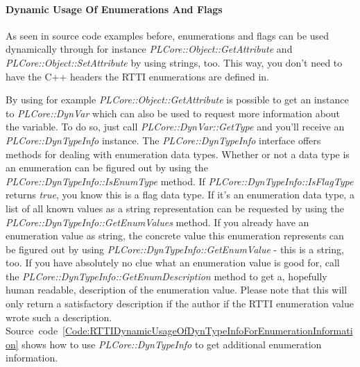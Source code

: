 \paragraph{Dynamic Usage Of Enumerations And Flags}
As seen in source code examples before, enumerations and flags can be used dynamically through for instance \emph{PLCore::Object::GetAttribute} and \emph{PLCore::Object::SetAttribute} by using strings, too. This way, you don't need to have the C++ headers the RTTI enumerations are defined in.

By using for example \emph{PLCore::Object::GetAttribute} is possible to get an instance to \emph{PLCore::DynVar} which can also be used to request more information about the variable. To do so, just call \emph{PLCore::DynVar::GetType} and you'll receive an \emph{PLCore::DynTypeInfo} instance. The \emph{PLCore::DynTypeInfo} interface offers methods for dealing with enumeration data types. Whether or not a data type is an enumeration can be figured out by using the \emph{PLCore::DynTypeInfo::IsEnumType} method. If \emph{PLCore::DynTypeInfo::IsFlagType} returns \emph{true}, you know this is a flag data type. If it's an enumeration data type, a list of all known values as a string representation can be requested by using the \emph{PLCore::DynTypeInfo::GetEnumValues} method. If you already have an enumeration value as string, the concrete value this enumeration represents can be figured out by using \emph{PLCore::DynTypeInfo::GetEnumValue} - this is a string, too. If you have absolutely no clue what an enumeration value is good for, call the \emph{PLCore::DynTypeInfo::GetEnumDescription} method to get a, hopefully human readable, description of the enumeration value. Please note that this will only return a satisfactory description if the author if the RTTI enumeration value wrote such a description. Source~code~\ref{Code:RTTIDynamicUsageOfDynTypeInfoForEnumerationInformation} shows how to use \emph{PLCore::DynTypeInfo} to get additional enumeration information.
